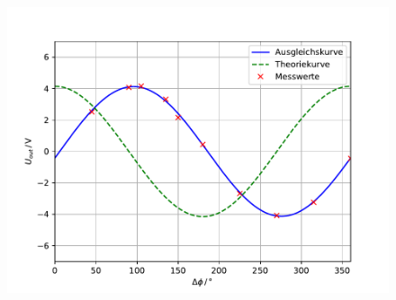 \begin{figure}
\centering
\includegraphics[scale=0.5]{content/images/plot.pdf}\label{fig:U2}
\end{figure}
